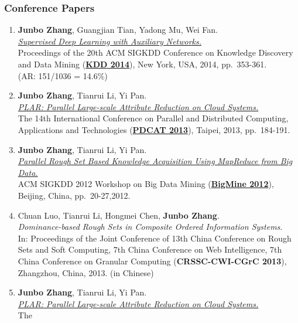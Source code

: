 \documentclass[]{article}
\begin{document}
\subsubsection{Conference Papers}\label{conference-papers}

\begin{enumerate}
\def\labelenumi{\arabic{enumi}.}
\item
  \textbf{Junbo Zhang}, Guangjian Tian, Yadong Mu, Wei Fan.\\
  \href{http://dx.doi.org/10.1145/2623330.2623618}{\emph{Supervised Deep
  Learning with Auxiliary Networks.}}\\ Proceedings of the 20th ACM
  SIGKDD Conference on Knowledge Discovery and Data Mining
  (\href{http://www.kdd.org/kdd2014/}{\textbf{KDD 2014}}), New York,
  USA, 2014, pp.~353-361.\\ (AR: 151/1036 = 14.6\%)
\item
  \textbf{Junbo Zhang}, Tianrui Li, Yi Pan.\\
  \href{http://dx.doi.org/10.1109/PDCAT.2013.36}{\emph{PLAR: Parallel
  Large-scale Attribute Reduction on Cloud Systems.}}\\ The 14th
  International Conference on Parallel and Distributed Computing,
  Applications and Technologies
  (\href{http://pdcat13.csie.ntust.edu.tw/}{\textbf{PDCAT 2013}}),
  Taipei, 2013, pp.~184-191.
\item
  \textbf{Junbo Zhang}, Tianrui Li, Yi Pan.\\
  \href{http://doi.acm.org/10.1145/2351316.2351320}{\emph{Parallel Rough
  Set Based Knowledge Acquisition Using MapReduce from Big Data.}}\\ ACM
  SIGKDD 2012 Workshop on Big Data Mining
  (\href{http://kdd2012.sigkdd.org/workshops.shtml}{\textbf{BigMine
  2012}}), Beijing, China, pp.~20-27,2012.
\item
  Chuan Luo, Tianrui Li, Hongmei Chen, \textbf{Junbo Zhang}.\\
  \emph{Dominance-based Rough Sets in Composite Ordered Information
  Systems}.\\ In: Proceedings of the Joint Conference of 13th China
  Conference on Rough Sets and Soft Computing, 7th China Conference on
  Web Intelligence, 7th China Conference on Granular Computing
  (\textbf{CRSSC-CWI-CGrC 2013}), Zhangzhou, China, 2013. (in Chinese)
\item
  \textbf{Junbo Zhang}, Tianrui Li, Yi Pan.\\ \href{}{\emph{PLAR:
  Parallel Large-scale Attribute Reduction on Cloud Systems.}}\\ The

\end{enumerate}
\end{document}
